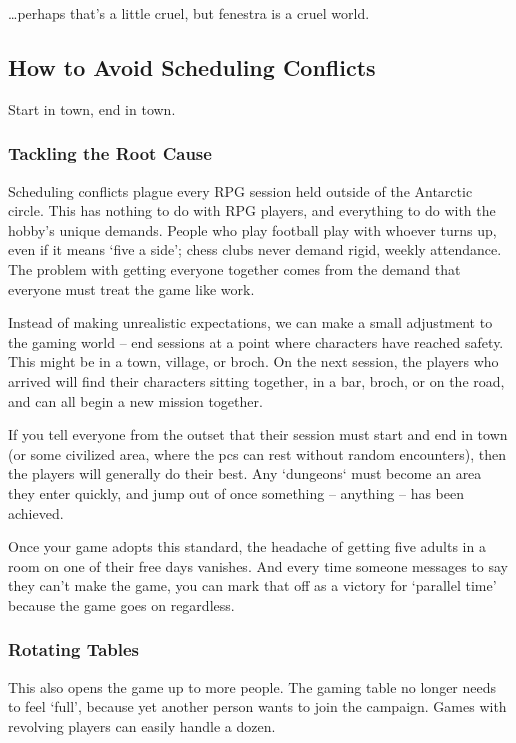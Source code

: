 \begin{multicols}{2}
\begin{speechtext}
\end{speechtext}

\ldots perhaps that's a little cruel, but \gls{fenestra} is a cruel world.

\subsection{How to Avoid Scheduling Conflicts}

Start in town, end in town.

\subsubsection{Tackling the Root Cause}

Scheduling conflicts plague every RPG session held outside of the Antarctic circle.
This has nothing to do with RPG players, and everything to do with the hobby's unique demands.
People who play football play with whoever turns up, even if it means `five a side'; chess clubs never demand rigid, weekly attendance.
The problem with getting everyone together comes from the demand that everyone must treat the game like work.

Instead of making unrealistic expectations, we can make a small adjustment to the gaming world -- end sessions at a point where characters have reached safety.
This might be in a town, \gls{village}, or \gls{broch}.
On the next session, the players who arrived will find their characters sitting together, in a bar, \gls{broch}, or on the road, and can all begin a new mission together.

If you tell everyone from the outset that their session must start and end in town (or some civilized area, where the \glspl{pc} can rest without random encounters), then the players will generally do their best.
Any `dungeons` must become an area they enter quickly, and jump out of once something -- anything -- has been achieved.

Once your game adopts this standard, the headache of getting five adults in a room on one of their free days vanishes.
And every time someone messages to say they can't make the game, you can mark that off as a victory for `parallel time' because the game goes on regardless.

\subsubsection{Rotating Tables}

This also opens the game up to more people.
The gaming table no longer needs to feel `full', because yet another person wants to join the campaign.
Games with revolving players can easily handle a dozen.


\end{multicols}
